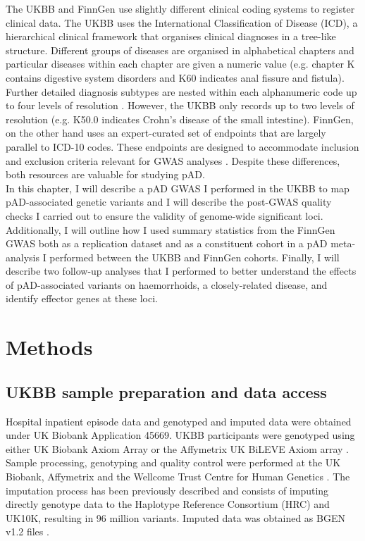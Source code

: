 The UKBB and FinnGen use slightly different clinical coding systems to register clinical data. The UKBB uses the International Classification of Disease (ICD), a hierarchical clinical framework that organises clinical diagnoses in a tree-like structure. Different groups of diseases are organised in alphabetical chapters and particular diseases within each chapter are given a numeric value (e.g. chapter K contains digestive system disorders and K60 indicates anal fissure and fistula). Further detailed diagnosis subtypes are nested within each alphanumeric code up to four levels of resolution \cite{icd10_levels}. However, the UKBB only records up to two levels of resolution (e.g. K50.0 indicates Crohn's disease of the small intestine). FinnGen, on the other hand uses an expert-curated set of endpoints that are largely parallel to ICD-10 codes. These endpoints are designed to accommodate inclusion and exclusion criteria relevant for GWAS analyses \cite{finngen_endpoints}. Despite these differences, both resources are valuable for studying pAD. \\

In this chapter, I will describe a pAD GWAS I performed in the UKBB to map pAD-associated genetic variants and I will describe the post-GWAS quality checks I carried out to ensure the validity of genome-wide significant loci. Additionally, I will outline how I used summary statistics from the FinnGen GWAS both as a replication dataset and as a constituent cohort in a pAD meta-analysis I performed between the UKBB and FinnGen cohorts. Finally, I will describe two follow-up analyses that I performed to better understand the effects of pAD-associated variants on haemorrhoids, a closely-related disease, and identify effector genes at these loci.

\section{Methods}
\subsection{UKBB sample preparation and data access}
Hospital inpatient episode data and genotyped and imputed data were obtained under UK Biobank Application 45669. UKBB participants were genotyped using either UK Biobank Axiom Array \cite{ukbbaxiom_array} or the Affymetrix UK
BiLEVE Axiom array \cite{ukbbbelieve_array}. Sample processing, genotyping and quality control were performed at the UK Biobank, Affymetrix and the Wellcome Trust Centre for Human Genetics \cite{ukbb_sample_processing}. The imputation process has been previously described \cite{Bycroft2018-fj} and consists of imputing directly genotype data to the Haplotype Reference Consortium (HRC) and UK10K, resulting in 96 million variants. Imputed data was obtained as BGEN v1.2 files \cite{Band2018-tv}. 
